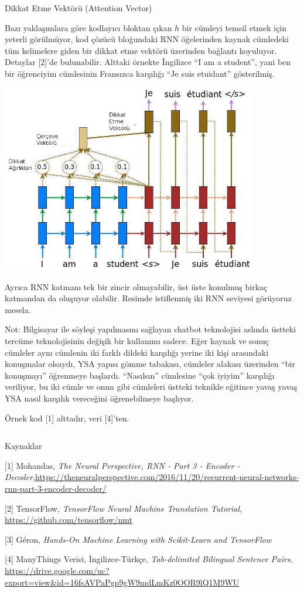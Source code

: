 \documentclass[12pt,fleqn]{article}\usepackage{../../common}
\begin{document}
Dikkat Etme Vektörü (Attention Vector)

Bazı yaklaşımlara göre kodlayıcı bloktan çıkan $h$ bir cümleyi temsil etmek
için yeterli görülmüyor, kod çözücü bloğundaki RNN öğelerinden kaynak
cümledeki tüm kelimelere giden bir dikkat etme vektörü üzerinden bağlantı
koyuluyor. Detaylar [2]'de bulunabilir. Alttaki örnekte İngilizce
``I am a student'', yani ben bir öğrenciyim cümlesinin Fransızca karşılığı
``Je suis etuidant'' gösterilmiş. 

\includegraphics[width=30em]{attention.jpg}

Ayrıca RNN katmanı tek bir zincir olmayabilir, üst üste konulmuş birkaç
katmandan da oluşuyor olabilir. Resimde istiflenmiş iki RNN seviyesi
görüyoruz mesela.

Not: Bilgisayar ile söyleşi yapılmasını sağlayan chatbot teknolojisi
aslında üstteki tercüme teknolojisinin değişik bir kullanımı sadece. Eğer
kaynak ve sonuç cümleler aynı cümlenin iki farklı dildeki karşılığı yerine
iki kişi arasındaki konuşmalar olsaydı, YSA yapısı gömme tabakası, cümleler
alakası üzerinden ``bir konuşmayı'' öğrenmeye başlardı. ``Nasılsın''
cümlesine ``çok iyiyim'' karşılığı veriliyor, bu iki cümle ve onun gibi
cümleleri üstteki teknikle eğitince yavaş yavaş YSA nasıl karşılık
vereceğini öğrenebilmeye başlıyor. 

Örnek kod [1] alttadır, veri [4]'ten.

\inputminted[fontsize=\footnotesize]{python}{translate.py}

Kaynaklar

[1] Mohandas, {\em The Neural Perspective, RNN - Part 3 - Encoder - Decoder},\url{https://theneuralperspective.com/2016/11/20/recurrent-neural-networks-rnn-part-3-encoder-decoder/}

[2] TensorFlow, {\em TensorFlow Neural Machine Translation Tutorial}, \url{https://github.com/tensorflow/nmt}

[3] Géron, {\em Hands-On Machine Learning with Scikit-Learn and TensorFlow}

[4] ManyThings Verisi, İngilizce-Türkçe, {\em Tab-delimited Bilingual Sentence Pairs}, \url{https://drive.google.com/uc?export=view&id=16fsAVPaPgp9gW9mdLmKz0OOR9lQ1M9WU}
\end{document}
